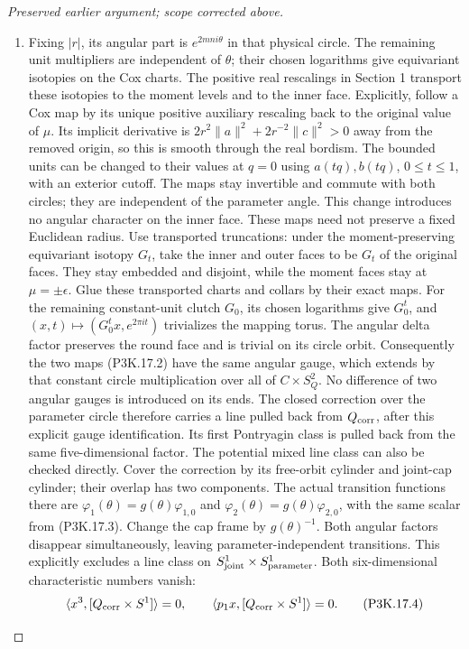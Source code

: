 \begin{proof}[Preserved earlier argument; scope corrected above]
\begin{enumerate}[label=\arabic*.]
\item Fixing \(|r|\), its angular part is
\(e^{2mn i\theta}\) in that physical circle.  The remaining
unit multipliers are independent of \(\theta\); their
chosen logarithms give equivariant isotopies on the Cox
charts.  The positive real rescalings in Section 1 transport
these isotopies to the moment levels and to the inner face.
Explicitly, follow a Cox map by its unique positive auxiliary
rescaling back to the original value of \(\mu\).  Its
implicit derivative is
\(2r^2\|a\|^2+2r^{-2}\|c\|^2>0\) away from the
removed origin, so this is smooth through the real bordism.
The bounded units can be changed to their values at \(q=0\)
using \(a(tq),b(tq)\), \(0\le t\le1\), with an
exterior cutoff.  The maps stay invertible and commute with
both circles; they are independent of the parameter angle.
This change introduces no angular character on the inner face.
These maps need not preserve a fixed Euclidean radius.
Use transported truncations: under the moment-preserving
equivariant isotopy \(G_t\), take the inner and outer
faces to be \(G_t\) of the original faces.  They stay
embedded and disjoint, while the moment faces stay at
\(\mu=\pm\epsilon\).  Glue these transported charts
and collars by their exact maps.  For the remaining
constant-unit clutch \(G_0\), its chosen logarithms give
\(G_0^t\), and
\((x,t)\mapsto(G_0^t x,e^{2\pi it})\) trivializes
the mapping torus.  The angular delta factor preserves
the round face and is trivial on its circle orbit.
Consequently the two maps (P3K.17.2) have the same angular
gauge, which extends by that constant circle multiplication
over all of \(C\times S^2_Q\).  No difference of two
angular gauges is introduced on its ends.  The closed
correction over the parameter circle therefore carries
a line pulled back from \(Q_{\rm corr}\), after this
explicit gauge identification.  Its first Pontryagin class
is pulled back from the same five-dimensional factor.
The potential mixed line class can also be checked directly.
Cover the correction by its free-orbit cylinder and joint-cap
cylinder; their overlap has two components.  The actual
transition functions there are
\(\varphi_1(\theta)=g(\theta)\varphi_{1,0}\) and
\(\varphi_2(\theta)=g(\theta)\varphi_{2,0}\), with
the same scalar from (P3K.17.3).  Change the cap frame by
\(g(\theta)^{-1}\).  Both angular factors disappear
simultaneously, leaving parameter-independent transitions.
This explicitly excludes a line class on
\(S^1_{\rm joint}\times S^1_{\rm parameter}\).
Both six-dimensional characteristic numbers vanish:
\[
  \langle x^3,[Q_{\rm corr}\times S^1]\rangle=0,
  \qquad
  \langle p_1x,[Q_{\rm corr}\times S^1]\rangle=0.       \tag{P3K.17.4}
\]


\end{enumerate}
\end{proof}
